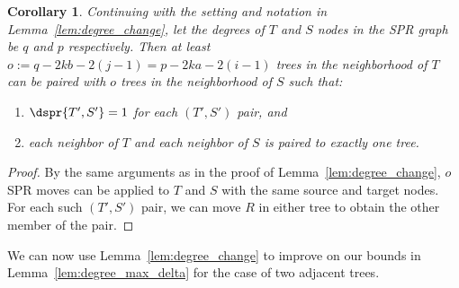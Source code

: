 \documentclass{amsart}
\newtheorem{corollary}[theorem]{Corollary}
\begin{document}
\begin{corollary}
\label{cor:paired_neighbors}
Continuing with the setting and notation in Lemma~\ref{lem:degree_change}, let the degrees of $T$ and $S$ nodes in the SPR graph be $q$ and $p$ respectively.
Then at least $o := q - 2kb - 2(j-1) = p - 2ka - 2(i-1)$ trees in the neighborhood of $T$ can be paired with $o$ trees in the neighborhood of $S$ such that:
\begin{enumerate}
\item $\dspr{T',S'} = 1$ for each $(T',S')$ pair, and
\item each neighbor of $T$ and each neighbor of $S$ is paired to exactly one tree.
\end{enumerate}
\end{corollary}
\begin{proof}
By the same arguments as in the proof of Lemma~\ref{lem:degree_change}, $o$ SPR moves can be applied to $T$ and $S$ with the same source and target nodes.
For each such $(T',S')$ pair, we can move $R$ in either tree to obtain the other member of the pair.
\end{proof}

We can now use Lemma~\ref{lem:degree_change} to improve on our bounds in Lemma~\ref{lem:degree_max_delta} for the case of two adjacent trees.
\end{document}
